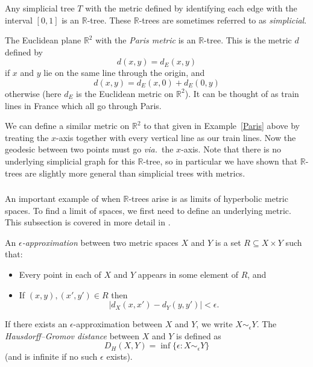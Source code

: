 \begin{example}
    Any simplicial tree $T$ with the metric defined by identifying each edge with the interval $[0,1]$ is an $\mathbb{R}$-tree. These $\mathbb{R}$-trees are sometimes referred to as \emph{simplicial}.
\end{example}

\begin{example}\label{Paris}
    The Euclidean plane $\mathbb{R}^2$ with the \textit{Paris metric} is an $\mathbb{R}$-tree. This is the metric $d$ defined by\[d(x,y)=d_E(x,y)\]if $x$ and $y$ lie on the same line through the origin, and\[d(x,y)=d_E(x,0)+d_E(0,y)\] otherwise (here $d_E$ is the Euclidean metric on $\mathbb{R}^2$). It can be thought of as train lines in France which all go through Paris.
\end{example}

\begin{example}\label{xtrains}
    We can define a similar metric on $\mathbb{R}^2$ to that given in Example~\ref{Paris} above by treating the $x$-axis together with every vertical line as our train lines. Now the geodesic between two points must go %
    \textit{via.}~the $x$-axis. Note that there is no underlying simplicial graph for this $\mathbb{R}$-tree, so in particular we have shown that $\mathbb{R}$-trees are slightly more general than simplicial trees with metrics.
\end{example}

\subsubsection{} An important example of when $\mathbb{R}$-trees arise is as limits of hyperbolic metric spaces. To find a limit of spaces, we first need to define an underlying metric. This subsection is covered in more detail in \cite[Section 1]{BridsonSwarup}.

\begin{definition}
    An $\epsilon$\emph{-approximation} between two metric spaces $X$ and $Y$ is a set $R\subseteq X\times Y$ such that:
    \begin{itemize}
        \item Every point in each of $X$ and $Y$ appears in some element of $R$, and
        \item If $(x,y),(x',y')\in R$ then \[\lvert d_X(x,x')-d_Y(y,y')\rvert<\epsilon.\]
    \end{itemize}
    If there exists an $\epsilon$-approximation between $X$ and $Y$, we write $X\sim_\epsilon Y$. The \emph{Hausdorff--Gromov distance} between $X$ and $Y$ is defined as \[D_H(X,Y)=\inf\{\epsilon:X\sim_\epsilon Y\}\] (and is infinite if no such $\epsilon$ exists).
\end{definition}

